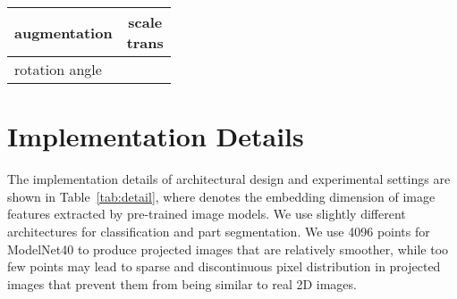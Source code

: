 \documentclass{article}
\begin{document}
\begin{table}
\begin{minipage}{.44\textwidth}
\begin{subtable}{\textwidth}
{\begin{tabular}{l|c}
    \midrule
    augmentation    & \makecell[c]{scale  \\ trans }    \\
    \midrule
    rotation angle  & \makecell[c]{ \\ } \\
    \bottomrule
  \end{tabular}}
\end{subtable}
\end{minipage}
\end{table}

\section{Implementation Details}

The implementation details of architectural design and experimental settings are shown in Table~\ref{tab:detail}, where  denotes the embedding dimension of image features extracted by pre-trained image models. We use slightly different architectures for classification and part segmentation. We use 4096 points for ModelNet40 to produce projected images that are relatively smoother, while too few points may lead to sparse and discontinuous pixel distribution in projected images that prevent them from being similar to real 2D images. 




\end{document}
